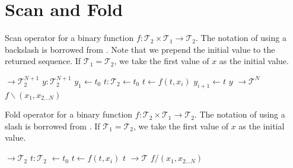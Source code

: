 \section{Scan and Fold}
\begin{algorithm}
    \caption{Scan operator for a binary function $f: \mathcal{T}_2 \times \mathcal{T}_1 \to \mathcal{T}_2$. The notation of using a backslash is borrowed from \citet{iverson62,iverson79}. Note that we prepend the initial value to the returned sequence. If $\mathcal{T}_1 = \mathcal{T}_2$, we take the first value of $x$ as the initial value.}
    \label{alg:scan}
    \begin{algorithmic}[1]  $\to \mathcal{T}_2^{N+1}$
            \State $y: \mathcal{T}_2^{N+1}$
            \State $y_1 \gets t_0$
            \Statex
            \State $t: \mathcal{T}_2 \gets t_0$
                \State $t \gets f(t, x_i)$
                \State $y_{i+1} \gets t$
            \EndFor
            \Statex
            \State \Return $y$
        \EndFunction
        \Statex
         $\to \mathcal{T}^N$
            \State \Return $f\backslash(x_1, x_{2 \ldots N})$
        \EndFunction
    \end{algorithmic}
\end{algorithm}

\begin{algorithm}
    \caption{Fold operator for a binary function $f: \mathcal{T}_2 \times \mathcal{T}_1 \to \mathcal{T}_2$. The notation of using a slash is borrowed from \citet{iverson62,iverson79}. If $\mathcal{T}_1 = \mathcal{T}_2$, we take the first value of $x$ as the initial value.}
    \label{alg:fold}
    \begin{algorithmic}[1]
         $\to \mathcal{T}_2$
            \State $t: \mathcal{T}_2$ $\gets t_0$
                \State $t \gets f(t, x_i)$
            \EndFor
            \Statex
            \State \Return $t$
        \EndFunction
        \Statex
         $\to \mathcal{T}$
            \State \Return $f/(x_1, x_{2 \ldots N})$
        \EndFunction
    \end{algorithmic}
\end{algorithm}

